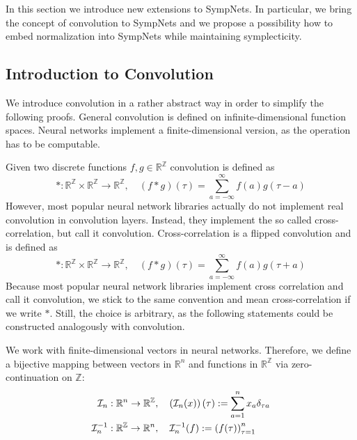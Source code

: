 \documentclass[twoside,a4paper]{article}
\begin{document}
In this section we introduce new extensions to SympNets. In particular, we bring the concept
of convolution to SympNets and we propose a possibility how to embed normalization into SympNets while
maintaining symplecticity.

\subsection{Introduction to Convolution}


We introduce convolution in a rather abstract way in order to simplify the following proofs.
General convolution is defined on infinite-dimensional function spaces.
Neural networks implement a finite-dimensional version, as the operation has to be
computable.

Given two discrete functions $f,g \in \mathbb{R}^\mathbb{Z}$ convolution is defined as 
\begin{equation*}
	*: \mathbb{R}^{\mathbb{Z}} \times \mathbb{R}^{\mathbb{Z}} \to \mathbb{R}^{\mathbb{Z}},
	\quad (f*g)(\tau) = \sum^{\infty}_{a=-\infty} f(a) g(\tau - a)
\end{equation*}
However, most popular neural network libraries actually do not implement real convolution
in convolution layers. Instead, they implement the so called cross-correlation, but call it convolution. 
Cross-correlation is a flipped convolution and is defined as
\begin{equation*}
	*: \mathbb{R}^{\mathbb{Z}} \times \mathbb{R}^{\mathbb{Z}} \to \mathbb{R}^{\mathbb{Z}},
	\quad (f*g)(\tau) = \sum^{\infty}_{a=-\infty} f(a) g(\tau + a)
\end{equation*}
Because most popular neural network libraries implement cross correlation and call it convolution,
we stick to the same convention and mean cross-correlation if we write $*$.
Still, the choice is arbitrary, as the following statements could be constructed analogously with convolution.

We work with finite-dimensional vectors in neural networks. Therefore, we define a bijective mapping between
vectors in $\mathbb{R}^n$ and functions in $\mathbb{R}^{\mathbb{Z}}$ 
via zero-continuation on $\mathbb{Z}$:
\begin{align*}
	\mathcal{I}_n &: \mathbb{R}^n \to \mathbb{R}^{\mathbb{Z}},
	\quad \left(\mathcal{I}_n(x)\right)(\tau) := \sum_{a=1}^{n} x_a \delta_{\tau a} \\
	\mathcal{I}_n^{-1} &: \mathbb{R}^{\mathbb{Z}} \to \mathbb{R}^n,
	\quad \mathcal{I}_n^{-1}(f) := \left( f(\tau) \right)_{\tau=1}^n
\end{align*}
\end{document}

